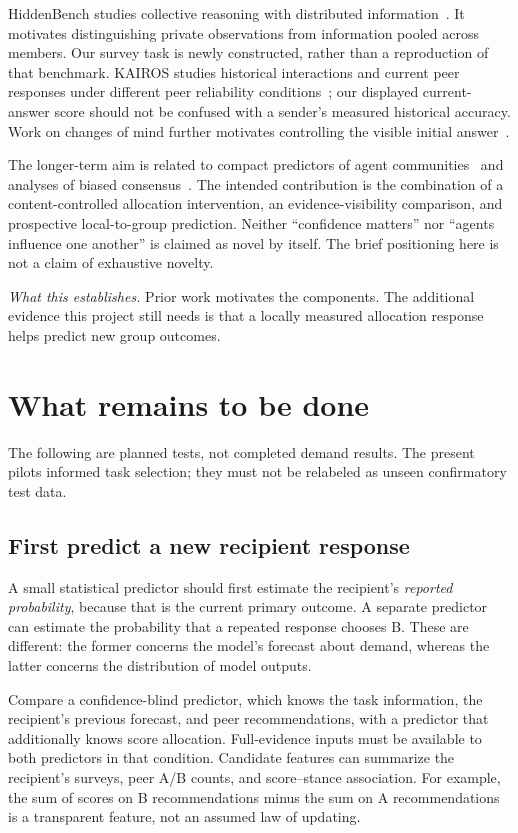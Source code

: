 \documentclass[11pt]{article}
\newcommand{\takeaway}[1]{\par\smallskip\noindent\textit{What this establishes.} #1\par\medskip}
\begin{document}
HiddenBench studies collective reasoning with distributed information~\cite{hiddenbench}. It motivates distinguishing private observations from information pooled across members. Our survey task is newly constructed, rather than a reproduction of that benchmark. KAIROS studies historical interactions and current peer responses under different peer reliability conditions~\cite{kairos}; our displayed current-answer score should not be confused with a sender's measured historical accuracy. Work on changes of mind further motivates controlling the visible initial answer~\cite{change}.

The longer-term aim is related to compact predictors of agent communities~\cite{physics} and analyses of biased consensus~\cite{biased}. The intended contribution is the combination of a content-controlled allocation intervention, an evidence-visibility comparison, and prospective local-to-group prediction. Neither ``confidence matters'' nor ``agents influence one another'' is claimed as novel by itself. The brief positioning here is not a claim of exhaustive novelty.

\takeaway{Prior work motivates the components. The additional evidence this project still needs is that a locally measured allocation response helps predict new group outcomes.}

\section{What remains to be done}
\label{sec:future}
The following are planned tests, not completed demand results. The present pilots informed task selection; they must not be relabeled as unseen confirmatory test data.

\subsection{First predict a new recipient response}
A small statistical predictor should first estimate the recipient's \emph{reported probability}, because that is the current primary outcome. A separate predictor can estimate the probability that a repeated response chooses B. These are different: the former concerns the model's forecast about demand, whereas the latter concerns the distribution of model outputs.

Compare a confidence-blind predictor, which knows the task information, the recipient's previous forecast, and peer recommendations, with a predictor that additionally knows score allocation. Full-evidence inputs must be available to both predictors in that condition. Candidate features can summarize the recipient's surveys, peer A/B counts, and score--stance association. For example, the sum of scores on B recommendations minus the sum on A recommendations is a transparent feature, not an assumed law of updating.
\end{document}
